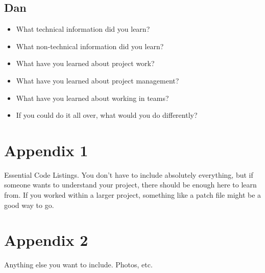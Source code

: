 \documentclass[compsoc,draftclsnofoot,onecolumn,10pt]{IEEEtran}
\begin{document}
\subsection{Dan}
\begin{itemize}
    \item What technical information did you learn?
    \item What non-technical information did you learn?
    \item What have you learned about project work?
    \item What have you learned about project management?
    \item What have you learned about working in teams?
    \item If you could do it all over, what would you do differently?
\end{itemize}

\section{Appendix 1}
Essential Code Listings. You don't have to include absolutely everything, but if someone wants to understand your project, there should be enough here to learn from. If you worked within a larger project, something like a patch file might be a good way to go.

\section{Appendix 2}
Anything else you want to include. Photos, etc.
\end{document}

